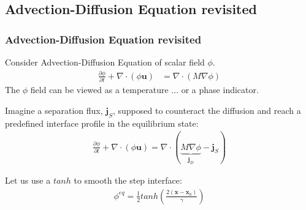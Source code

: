 \documentclass[10pt,handout]{beamer}
\begin{document}

\subsection{Advection-Diffusion Equation revisited}
\begin{frame}\frametitle{Advection-Diffusion Equation revisited} 
Consider Advection-Diffusion Equation of scalar field $\phi$. 
\begin{align*}
\frac{\partial \phi}{\partial t} + \nabla \cdot (\phi \boldsymbol{u} ) &= \nabla \cdot (M \nabla \phi) %
\end{align*}
The $ \phi $ field can be viewed as a temperature ... or a phase indicator.

\pause
Imagine a separation flux, $\textbf{j}_S$, supposed to counteract the diffusion and reach a predefined interface profile in the equilibrium state:
\begin{eqnarray}
\frac{\partial \phi}{\partial t} + \nabla \cdot (\phi \textbf{u})
=
\nabla \cdot (  
  \underbrace{ M \nabla \phi }_{\textbf{j}_D}
 - \textbf{j}_S
) \nonumber
\end{eqnarray}

\pause
Let us use a $tanh$ to smooth the step interface:
\begin{eqnarray}
\phi^{eq} = \frac{1}{2} tanh
\left(
\frac{2(\textbf{x} - \textbf{x}_0) }{\gamma}
\right) \nonumber
\end{eqnarray}
\end{frame}
\end{document}
